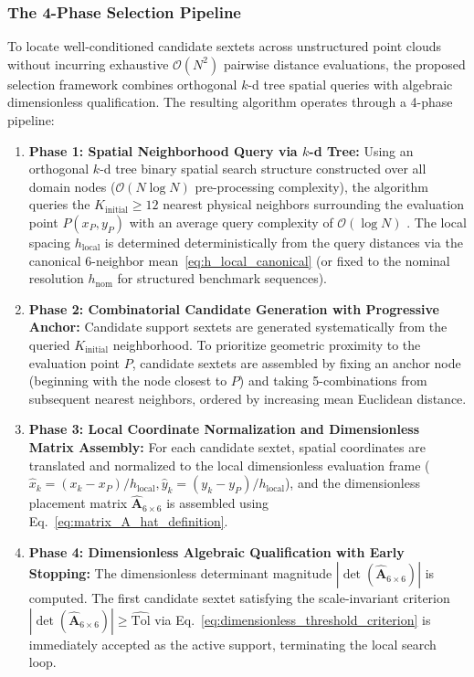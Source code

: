 \documentclass[preprint,12pt]{elsarticle}
\begin{document}
\subsubsection{The 4-Phase Selection Pipeline}
\label{subsec:4phase_pipeline}

To locate well-conditioned candidate sextets across unstructured point clouds without incurring exhaustive $\mathcal{O}(N^2)$ pairwise distance evaluations, the proposed selection framework combines orthogonal $k$-d tree spatial queries \cite{bentley1975multidimensional,parreira2006efficient,fasshauer2007meshfree,goncalves2025tese} with algebraic dimensionless qualification. The resulting algorithm operates through a 4-phase pipeline:

\begin{enumerate}
    \item \textbf{Phase 1: Spatial Neighborhood Query via $k$-d Tree:} Using an orthogonal $k$-d tree binary spatial search structure constructed over all domain nodes ($\mathcal{O}(N \log N)$ pre-processing complexity), the algorithm queries the $K_{\mathrm{initial}} \ge 12$ nearest physical neighbors surrounding the evaluation point $P(x_P, y_P)$ with an average query complexity of $\mathcal{O}(\log N)$ \cite{bentley1975multidimensional, parreira2006efficient, fasshauer2007meshfree}. The local spacing $h_{\mathrm{local}}$ is determined deterministically from the query distances via the canonical 6-neighbor mean~\eqref{eq:h_local_canonical} (or fixed to the nominal resolution $h_{\mathrm{nom}}$ for structured benchmark sequences).
    
    \item \textbf{Phase 2: Combinatorial Candidate Generation with Progressive Anchor:} Candidate support sextets are generated systematically from the queried $K_{\mathrm{initial}}$ neighborhood. To prioritize geometric proximity to the evaluation point $P$, candidate sextets are assembled by fixing an anchor node (beginning with the node closest to $P$) and taking 5-combinations from subsequent nearest neighbors, ordered by increasing mean Euclidean distance.
    
    \item \textbf{Phase 3: Local Coordinate Normalization and Dimensionless Matrix Assembly:} For each candidate sextet, spatial coordinates are translated and normalized to the local dimensionless evaluation frame ($\hat{x}_k = (x_k - x_P)/h_{\mathrm{local}}, \hat{y}_k = (y_k - y_P)/h_{\mathrm{local}}$), and the dimensionless placement matrix $\widehat{\mathbf{A}}_{6 \times 6}$ is assembled using Eq.~\eqref{eq:matrix_A_hat_definition}.
    
    \item \textbf{Phase 4: Dimensionless Algebraic Qualification with Early Stopping:} The dimensionless determinant magnitude $|\det(\widehat{\mathbf{A}}_{6\times6})|$ is computed. The first candidate sextet satisfying the scale-invariant criterion $|\det(\widehat{\mathbf{A}}_{6\times6})| \ge \widehat{\mathrm{Tol}}$ via Eq.~\eqref{eq:dimensionless_threshold_criterion} is immediately accepted as the active support, terminating the local search loop.
\end{enumerate}
\end{document}
